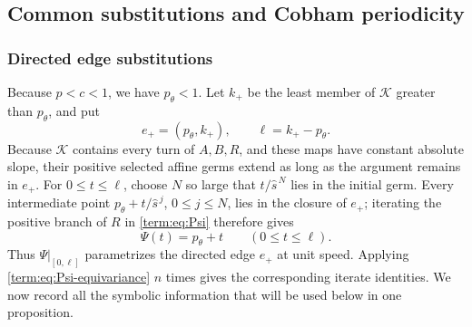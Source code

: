 \documentclass[11pt]{article}
\theoremstyle{definition}
\theoremstyle{remark}
\begin{document}
\subsection{Common substitutions and Cobham periodicity}

\subsubsection{Directed edge substitutions}

Because \(p<c<1\), we have \(p_\theta<1\).  Let \(k_+\) be the least member
of \(\mathcal K\) greater than \(p_\theta\), and put
\[
 e_+=(p_\theta,k_+),\qquad \ell=k_+-p_\theta.
\]
Because \(\mathcal K\) contains every turn of \(A,B,R\), and these maps have
constant absolute slope, their positive selected affine germs extend as
long as the argument remains in \(e_+\).  For \(0\leq t\leq\ell\), choose
\(N\) so large that \(t/\widehat s^{\,N}\) lies in the initial germ.
Every intermediate point
\(p_\theta+t/\widehat s^{\,j}\), \(0\leq j\leq N\), lies in the closure of
\(e_+\); iterating the positive branch of \(R\) in
\eqref{term:eq:Psi} therefore gives
\[
 \Psi(t)=p_\theta+t\qquad(0\leq t\leq\ell).
\]
Thus \(\Psi|_{[0,\ell]}\) parametrizes the directed edge \(e_+\) at unit
speed.  Applying \eqref{term:eq:Psi-equivariance} \(n\) times gives the
corresponding iterate identities.  We now record all the symbolic information
that will be used below in one proposition.
\end{document}
